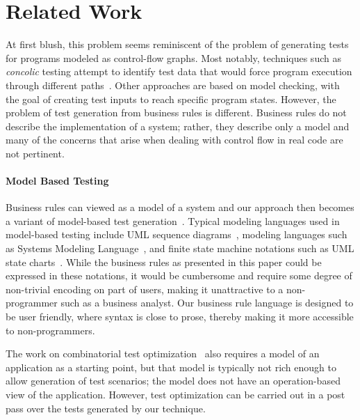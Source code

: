 \section{Related Work}
\label{sec:related}

At first blush, this problem seems reminiscent of the problem of generating
tests for programs modeled as control-flow graphs. 
Most notably, techniques such as \textit{concolic} testing
attempt to identify test data that would force program execution through
different paths~\cite{dart, concolic}. Other approaches are based on model
checking, with the goal of creating test inputs to reach specific program
states. However, the problem of test generation from business rules is
different. Business rules do not describe the implementation of a system;
rather, they describe only a model and many of the concerns that arise when
dealing with control flow in real code are not pertinent.

\paragraph*{Model Based Testing} Business rules can viewed as a model of a system
and our approach then becomes a variant of model-based test
generation~\cite{utting2012}. Typical modeling languages used in model-based
testing include UML sequence diagrams~\cite{nayak2009}, modeling
languages such as Systems Modeling Language~\cite{friedenthal2011}, and
finite state machine notations such as UML state charts~\cite{offhut99}. While
the business rules as presented in this paper could be expressed in these
notations, it would be cumbersome and require some degree of non-trivial
encoding on part of users, making it unattractive to a non-programmer such as a
business analyst. Our business rule language is designed to be user friendly,
where syntax is close to prose, thereby making it more accessible to
non-programmers.


The work on combinatorial test optimization~\cite{segall2012} also requires a model 
of an application as a starting point, but that model is typically not rich
enough to allow generation of test scenarios; the model does not have an operation-based
view of the application. However, test optimization 
can be carried out in a post pass over the tests generated by our technique.

